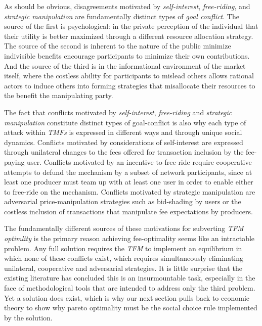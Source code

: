 As should be obvious, disagreements motivated by \textit{self-interest}, \textit{free-riding}, and \textit{strategic manipulation} are fundamentally distinct types of \textit{goal conflict}. The source of the first is psychological: in the private perception of the individual that their utility is better maximized through a different resource allocation strategy. The source of the second is inherent to the nature of the public  minimize indivisible benefits encourage participants to minimize their own contributions. And the source of the third is in the informational environment of the market itself, where the costless ability for participants to mislead others allows rational actors to induce others into forming strategies that misallocate their resources to the benefit the manipulating party.

The fact that conflicts motivated by \textit{self-interest}, \textit{free-riding} and \textit{strategic manipulation} constitute distinct types of goal-conflict is also why each type of attack within \textit{TMFs} is expressed in different ways and through unique social dynamics. Conflicts motivated by considerations of self-interest are expressed through unilateral changes to the fees offered for transaction inclusion by the fee-paying user. Conflicts motivated by an incentive to free-ride require cooperative attempts to defund the mechanism by a subset of network participants, since at least one producer must team up with at least one user in order to enable either to free-ride on the mechanism. Conflicts motivated by strategic manipulation are adversarial price-manipulation strategies such as bid-shading by users or the costless inclusion of transactions that manipulate fee expectations by producers.

The fundamentally different sources of these motivations for subverting \textit{TFM optimlity} is the primary reason achieving fee-optimality seems like an intractable problem. Any full solution requires the \textit{TFM} to implement an equilibrium in which none of these conflicts exist, which requires simultaneously eliminating unilateral, cooperative and adversarial strategies. It is little surprise that the existing literature has concluded this is an insurmountable task, especially in the face of methodological tools that are intended to address only the third problem. Yet a solution does exist, which is why our next section pulls back to economic theory to show why pareto optimality must be the social choice rule implemented by the solution.



